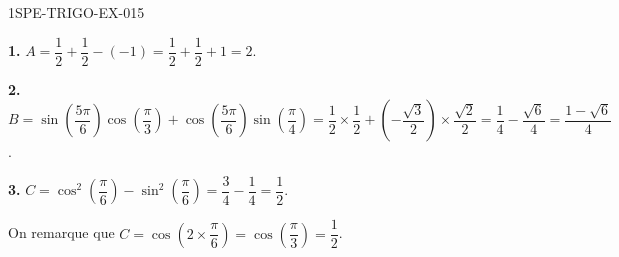 \begin{corrige}{1SPE-TRIGO-EX-015}

\textbf{1.} $A = \dfrac{1}{2} + \dfrac{1}{2} - (-1) = \dfrac{1}{2} + \dfrac{1}{2} + 1 = 2$.

\textbf{2.} $B = \sin\!\left(\dfrac{5\pi}{6}\right)\cos\!\left(\dfrac{\pi}{3}\right) + \cos\!\left(\dfrac{5\pi}{6}\right)\sin\!\left(\dfrac{\pi}{4}\right) = \dfrac{1}{2} \times \dfrac{1}{2} + \left(-\dfrac{\sqrt{3}}{2}\right) \times \dfrac{\sqrt{2}}{2} = \dfrac{1}{4} - \dfrac{\sqrt{6}}{4} = \dfrac{1 - \sqrt{6}}{4}$.

\textbf{3.} $C = \cos^2\!\left(\dfrac{\pi}{6}\right) - \sin^2\!\left(\dfrac{\pi}{6}\right) = \dfrac{3}{4} - \dfrac{1}{4} = \dfrac{1}{2}$.

On remarque que $C = \cos\!\left(2 \times \dfrac{\pi}{6}\right) = \cos\!\left(\dfrac{\pi}{3}\right) = \dfrac{1}{2}$. \checkmark

\end{corrige}
